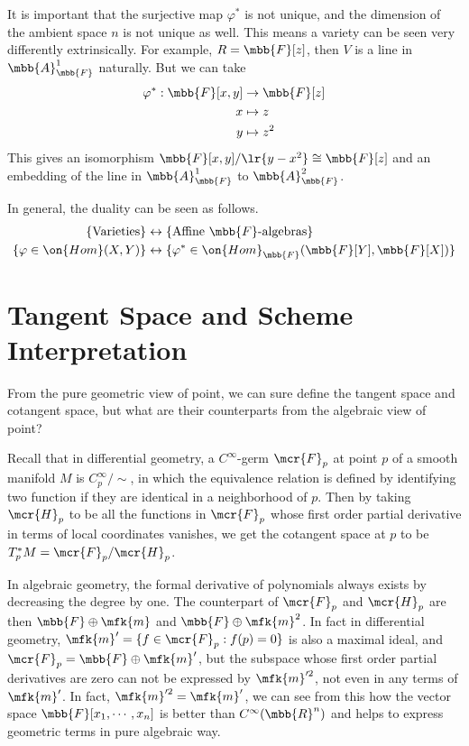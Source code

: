\documentclass[12pt]{article}
\begin{document}
It is important that the surjective map $\varphi^*$ is not unique, and the dimension of the ambient space $n$ is not unique as well. This means a variety can be seen very differently extrinsically. For example, $R=\mbb{F}[z]$, then $V$ is a line in $\mbb{A}_{\mbb{F}}^1$ naturally. But we can take
\begin{align*}
\varphi^*:\mbb{F}[x,y]&\rightarrow\mbb{F}[z]\\
x&\mapsto z\\
y&\mapsto z^2
\end{align*}
This gives an isomorphism $\mbb{F}[x,y]/\lr{y-x^2}\cong\mbb{F}[z]$ and an embedding of the line in $\mbb{A}_{\mbb{F}}^1$ to $\mbb{A}_{\mbb{F}}^2$.

In general, the duality can be seen as follows.
\begin{align*}
	\{\text{Varieties}\}&\leftrightarrow\{\text{Affine $\mbb{F}$-algebras}\}\\
	\{\varphi\in\on{Hom}(X,Y)\}&\leftrightarrow\{\varphi^*\in\on{Hom}_{\mbb{F}}(\mbb{F}[Y],\mbb{F}[X])\}
\end{align*} 
  
\section{Tangent Space and Scheme Interpretation}
From the pure geometric view of point, we can sure define the tangent space and cotangent space, but what are their counterparts from the algebraic view of point?

Recall that in differential geometry, a $C^{\infty}$-germ $\mcr{F}_p$ at point $p$ of a smooth manifold $M$ is $C_p^{\infty}/\sim$, in which the equivalence relation is defined by identifying two function if they are identical in a neighborhood of $p$. Then by taking $\mcr{H}_p$ to be all the functions in $\mcr{F}_p$ whose first order partial derivative in terms of local coordinates vanishes, we get the cotangent space at $p$ to be $T_p^*M=\mcr{F}_p/\mcr{H}_p$.

In algebraic geometry, the formal derivative of polynomials always exists by decreasing the degree by one. The counterpart of $\mcr{F}_p$ and $\mcr{H}_p$ are then $\mbb{F}\oplus\mfk{m}$ and $\mbb{F}\oplus\mfk{m}^2$. In fact in differential geometry, $\mfk{m}'=\{f\in\mcr{F}_p:f(p)=0\}$ is also a maximal ideal, and $\mcr{F}_p=\mbb{F}\oplus\mfk{m}'$, but the subspace whose first order partial derivatives are zero can not be expressed by $\mfk{m}'^2$, not even in any terms of $\mfk{m}'$. In fact, $\mfk{m}'^2=\mfk{m}'$, we can see from this how the vector space $\mbb{F}[x_1,\cdots,x_n]$ is better than $C^{\infty}(\mbb{R}^n)$ and helps to express geometric terms in pure algebraic way.
\end{document}
